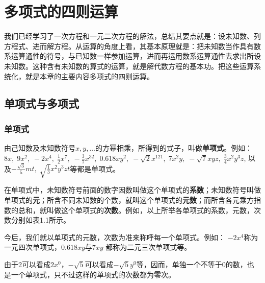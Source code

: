 \chapter{多项式的四则运算}

我们已经学习了一次方程和一元二次方程的解法，总结其要点就是：设未知数、列方程式、进而解方程。从运算的角度上看，其基本原理就是：把未知数当作具有数系运算通性的符号，与已知数一样参加运算，进而再运用数系运算通性去求出所设未知数。这种含有未知数的算式的运算，就是解代数方程的基本功。把这些运算系统化，就是本章的主要内容多项式的四则运算。

\section{单项式与多项式}
\subsection{单项式}
由己知数及未知数符号$x,y,\ldots$的方幂相乘，所得到的式子，叫做\textbf{单项式}。例如：
$8x,\; 9x^2,\; -2x^4,\; \frac{1}{2}x^7,\; -\frac{3}{7}x^{32},\; 0.618xy^2,\; -\sqrt{2}x^{121},\; 7x^2y,\; -\sqrt{7}xyz,\; \frac{3}{4}x^2y^3z$, 以及$-\frac{\sqrt{3}}{5}mt,\; \sqrt{\frac{1}{3}}x^2y^3zt$等都是单项式。

在单项式中，未知数符号前面的数字因数叫做这个单项式的\textbf{系数}；未知数符号叫做单项式的\textbf{元}；所含不同未知数的个数，就叫这个单项式的\textbf{元数}；而所含各元乘方指数的总和，就叫做这个单项式的\textbf{次数}。例如，以上所举各单项式的系数，元数，次数分别如表1.1所示。


今后，我们就以单项式的元数，次数为准来称呼每一个单项式。例如：
$-2x^4$称为一元四次单项式，$0.618xy$与$7xy$
都称为二元三次单项式等。

由于2可以看成$2x^0$，$-\sqrt{5}$可以看成$-\sqrt{5}y^0$等，因而，单独一个不等于0的数，也是一个单项式，只不过这样的单项式的次数都为零次。


